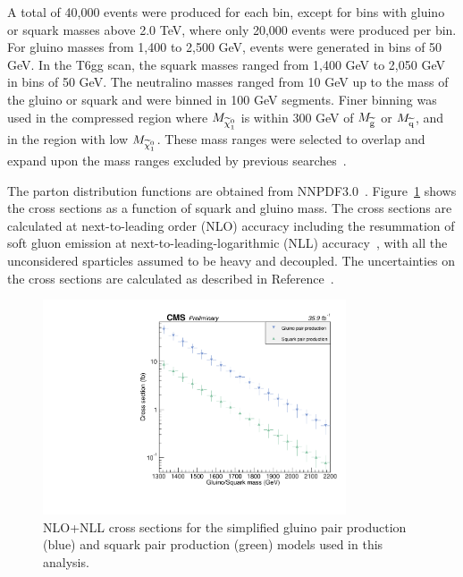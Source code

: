 A total of 40,000 events were produced for
each bin, except for bins with gluino or squark masses above 2.0 TeV, where only
20,000 events were produced per bin.
For gluino masses from 1,400 to 2,500 GeV, events were generated
in bins of 50 GeV.  In the T6gg scan, the squark masses ranged from
1,400 GeV to 2,050 GeV in bins of 50 GeV.
The neutralino masses ranged from 10 GeV up to the mass
of the gluino or squark and were binned in
100 GeV segments. Finer binning was used in the compressed region where
$M_{\widetilde{\chi}^{0}_{1}}$ is within 300 GeV of $M_{\widetilde{\mathrm{g}}}$ or $M_{\widetilde{\mathrm{q}}}$,
and in the region with low $M_{\widetilde{\chi}^{0}_{1}}$.
These mass ranges were selected to overlap and
expand upon the mass ranges excluded by previous
searches~\cite{ATLAS:2016aa,CMS:2015_anal}.

The parton distribution
functions are obtained from NNPDF3.0~\cite{Ball:2014uwa}.
Figure~\ref{fig:xSec} shows the cross sections as a function
of squark and gluino mass.
The cross sections are calculated at next-to-leading order 
(NLO) accuracy including the resummation of soft gluon emission
at next-to-leading-logarithmic (NLL) accuracy~\cite{Kulesza:2009kq, Beenakker:2009ha},
with all the unconsidered sparticles assumed to be heavy and decoupled.
The uncertainties on the cross sections are calculated as
described in Reference~\cite{Borschensky:2014cia}.


\begin{figure}[htbp]
    \centering
    \includegraphics[width=0.8\textwidth]{Figures/Results/xSecPlot.pdf}
    \caption[NLO+NLL cross sections for the simplified gluino pair production
    and squark pair production models used in this analysis.]
    {NLO+NLL cross sections for the simplified gluino pair production (blue)
    and squark pair production (green) models used in this analysis.}
    \label{fig:xSec}
\end{figure}

